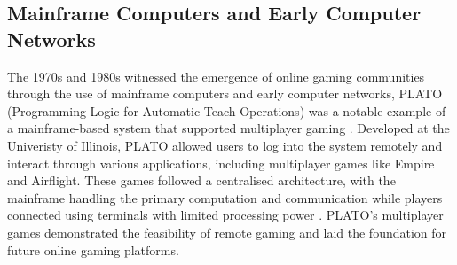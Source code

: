 \subsection{Mainframe Computers and Early Computer Networks}
The 1970s and 1980s witnessed the emergence of online gaming communities through the use of mainframe computers and early computer networks, PLATO (Programming Logic for Automatic Teach Operations) was a notable example of a mainframe-based system that supported multiplayer gaming \cite{arm2006networking}. Developed at the Univeristy of Illinois, PLATO allowed users to log into the system remotely and interact through various applications, including multiplayer games like Empire and Airflight. These games followed a centralised architecture, with the mainframe handling the primary computation and communication while players connected using terminals with limited processing power \cite{arm2006networking}. PLATO's multiplayer games demonstrated the feasibility of remote gaming and laid the foundation for future online gaming platforms. 

